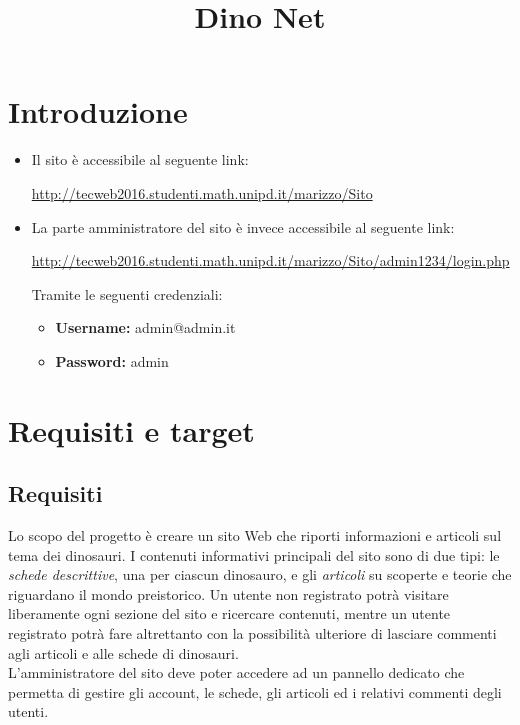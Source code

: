 \documentclass[12pt]{article}
\title{Dino Net}
\begin{document}
	\maketitle
	\newpage
	\tableofcontents
	\clearpage
	
	\section{Introduzione}
	
	\begin{itemize}
		\item Il sito è accessibile al seguente link:
		
		\begin{center}
			\url{http://tecweb2016.studenti.math.unipd.it/marizzo/Sito}
		\end{center}
			
		\item La parte amministratore del sito è invece accessibile al seguente link:
		
		\begin{center}
			\url{http://tecweb2016.studenti.math.unipd.it/marizzo/Sito/admin1234/login.php}
		\end{center}
		
		Tramite le seguenti credenziali:
		
		\begin{itemize}
			\item \textbf{Username:} admin@admin.it
			\item \textbf{Password:} admin
		\end{itemize}
	\end{itemize}
	
	\section{Requisiti e target}
	
	\subsection{Requisiti}	
	Lo scopo del progetto è creare un sito Web che riporti informazioni e articoli sul tema dei dinosauri. I contenuti informativi principali del sito sono di due tipi: le \textit{schede descrittive}, una per ciascun dinosauro, e gli \textit{articoli} su scoperte e teorie che riguardano il mondo preistorico. Un utente non registrato potrà visitare liberamente ogni sezione del sito e ricercare contenuti, mentre un utente registrato potrà fare altrettanto con la possibilità ulteriore di lasciare commenti agli articoli e alle schede di dinosauri.\\
	L'amministratore del sito deve poter accedere ad un pannello dedicato che permetta di gestire gli account, le schede, gli articoli ed i relativi commenti degli utenti.	
	
\end{document}
